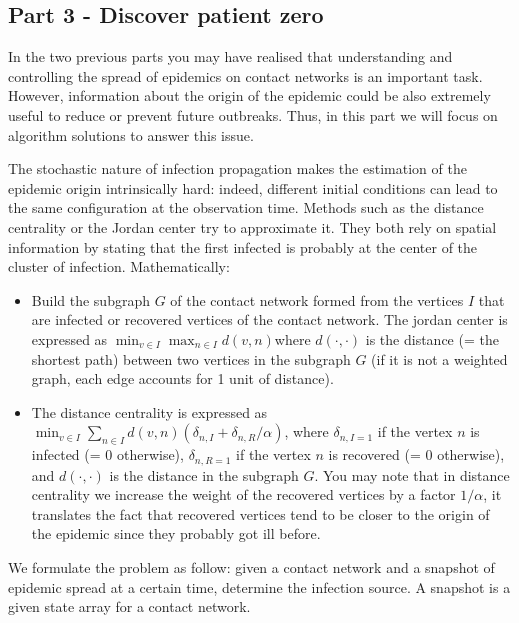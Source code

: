 \documentclass{article}
\begin{document}
\subsection*{Part 3 - Discover patient zero}

 In the two previous parts you may have realised that understanding and controlling the spread of epidemics on contact networks is an important task. However, information about the origin of the epidemic could be also extremely useful to reduce or prevent future outbreaks. Thus, in this part we will focus on algorithm solutions to answer this issue.

The stochastic nature of infection propagation makes the estimation of the epidemic origin intrinsically hard: indeed, different initial conditions can lead to the same configuration at the observation time. Methods such as the distance centrality or the Jordan center try to approximate it. They both rely on spatial information by stating that the first infected is probably at the center of the cluster of infection. Mathematically:

\begin{itemize}
    \item Build the subgraph $G$ of the contact network formed from the vertices $I$ that are infected or recovered vertices of the contact network. The jordan center is expressed as $\min_{v\in I}\max_{n \in I}d(v,n)$where $d(\cdot,\cdot)$ is the distance (= the shortest path) between two vertices in the subgraph $G$ (if it is not a weighted graph, each edge accounts for 1 unit of distance).

    \item The distance centrality is expressed as $\min_{v\in I}\sum_{n\in I}d(v,n)(\delta_{n,I}+\delta_{n,R}/\alpha)$, where $\delta_{n,I=1}$ if the vertex $n$ is infected (= 0 otherwise), $\delta_{n,R=1}$ if the vertex $n$ is recovered (= 0 otherwise), and $d(\cdot,\cdot)$ is the distance in the subgraph $G$. You may note that in distance centrality we increase the weight of the recovered vertices by a factor $1/\alpha$, it translates the fact that recovered vertices tend to be closer to the origin of the epidemic since they probably got ill before.
\end{itemize}

We formulate the problem as follow: given a contact network and a snapshot of epidemic spread at a certain time, determine the infection source. A snapshot is a given state array for a contact network.

\medskip
\end{document}
